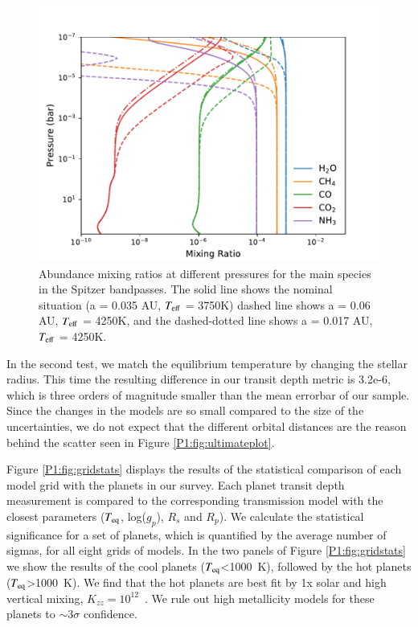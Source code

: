 \begin{figure}
    \centering
    \includegraphics[width=\linewidth]{a-test.pdf}
    \caption{Abundance mixing ratios at different pressures for the main species in the Spitzer bandpasses. The solid line shows the nominal situation (a = 0.035 AU, $T_{\rm eff}$ = 3750K) dashed line shows a = 0.06 AU, $T_{\rm eff}$ = 4250K, and the dashed-dotted line shows a = 0.017 AU, $T_{\rm eff}$ = 4250K.}
    \label{P1:fig:Tefftest}
\end{figure}

In the second test, we match the equilibrium temperature by changing the stellar radius. This time the resulting difference in our transit depth metric is 3.2e-6, which is three orders of magnitude smaller than the mean errorbar of our sample. Since the changes in the models are so small compared to the size of the uncertainties, we do not expect that the different orbital distances are the reason behind the scatter seen in Figure \ref{P1:fig:ultimateplot}.

Figure \ref{P1:fig:gridstats} displays the results of the statistical comparison of each model grid with the planets in our survey. Each planet transit depth measurement is compared to the corresponding transmission model with the closest parameters ($T_{\rm eq}$, log($g_p$), $R_s$ and $R_p$). We calculate the statistical significance for a set of planets, which is quantified by the average number of sigmas, for all eight grids of models. In the two panels of Figure \ref{P1:fig:gridstats} we show the results of the cool planets ($T_{\rm eq}$<1000~K), followed by the hot planets ($T_{\rm eq}$>1000~K). We find that the hot planets are best fit by 1x solar and high vertical mixing, $K_{zz} = 10^{12}$~\cmcms. We rule out high metallicity models for these planets to $\sim3\sigma$ confidence.

